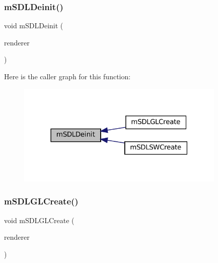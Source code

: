 \subsubsection{\texorpdfstring{m\+S\+D\+L\+Deinit()}{mSDLDeinit()}}
{\footnotesize\ttfamily void m\+S\+D\+L\+Deinit (\begin{DoxyParamCaption}\item[{struct S\+D\+L\+Software\+Renderer $\ast$}]{renderer }\end{DoxyParamCaption})\hspace{0.3cm}{\ttfamily [static]}}

Here is the caller graph for this function\+:
\nopagebreak
\begin{figure}[H]
\begin{center}
\leavevmode
\includegraphics[width=283pt]{pandora-sdl_8c_a2e844dec0a5e889059cdf4f395679121_icgraph}
\end{center}
\end{figure}
\mbox{\label{pandora-sdl_8c_ac0f0fed0a8f63ea7109a5427609fb678}} 
\subsubsection{\texorpdfstring{m\+S\+D\+L\+G\+L\+Create()}{mSDLGLCreate()}}
{\footnotesize\ttfamily void m\+S\+D\+L\+G\+L\+Create (\begin{DoxyParamCaption}\item[{struct S\+D\+L\+Software\+Renderer $\ast$}]{renderer }\end{DoxyParamCaption})}

